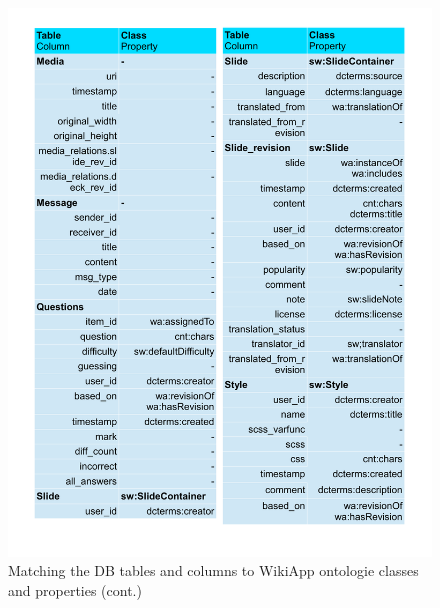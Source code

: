 \begin{figure}[!b]
	\centering
		\includegraphics[width=\columnwidth]{images/mapping_pages2.pdf}
		\caption{Matching the DB tables and columns to WikiApp ontologie classes and properties (cont.)}
	\label{fig:wa_matching_2}
\end{figure}

